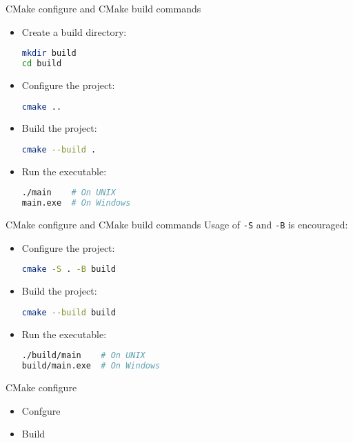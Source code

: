 \documentclass{beamer}
\begin{document}
\begin{frame}[fragile]{CMake configure and CMake build commands}
  \begin{itemize}
    \item Create a build directory:
    \begin{lstlisting}[language=bash]
mkdir build
cd build
    \end{lstlisting}
    \item Configure the project:
    \begin{lstlisting}[language=bash]
cmake ..
    \end{lstlisting}
    \item Build the project:
    \begin{lstlisting}[language=bash]
cmake --build .
    \end{lstlisting}
    \item Run the executable:
    \begin{lstlisting}[language=bash]
./main    # On UNIX
main.exe  # On Windows
    \end{lstlisting}
  \end{itemize}
\end{frame}

\begin{frame}[fragile]{CMake configure and CMake build commands}
  Usage of \texttt{-S} and \texttt{-B} is encouraged:

  \begin{itemize}
    \item Configure the project:
    \begin{lstlisting}[language=bash]
cmake -S . -B build
    \end{lstlisting}
    \item Build the project:
    \begin{lstlisting}[language=bash]
cmake --build build
    \end{lstlisting}
    \item Run the executable:
    \begin{lstlisting}[language=bash]
./build/main    # On UNIX
build/main.exe  # On Windows
    \end{lstlisting}
  \end{itemize}
\end{frame}

\begin{frame}{CMake configure}
  \begin{itemize}
    \item Confgure
    \item Build
  \end{itemize}
\end{frame}
\end{document}
